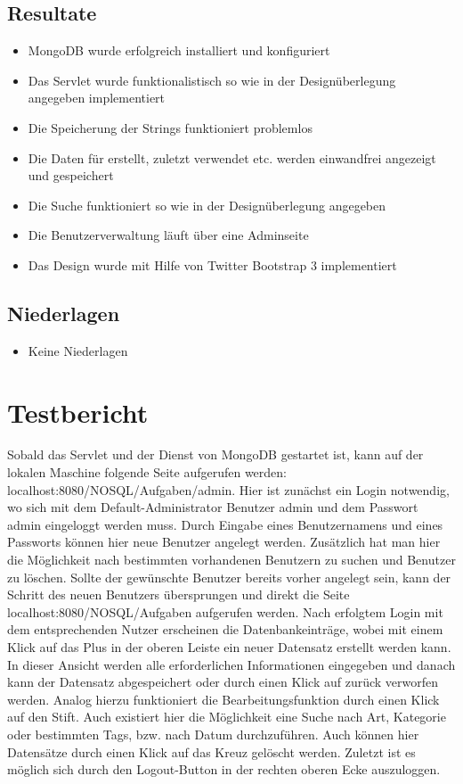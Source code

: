 \documentclass[a4paper,12pt]{scrreprt}
\begin{document}
\section{Resultate}
\begin{itemize}
\item MongoDB wurde erfolgreich installiert und konfiguriert
\item Das Servlet wurde funktionalistisch so wie in der Designüberlegung angegeben implementiert
\item Die Speicherung der Strings funktioniert problemlos
\item Die Daten für erstellt, zuletzt verwendet etc. werden einwandfrei angezeigt und gespeichert
\item Die Suche funktioniert so wie in der Designüberlegung angegeben
\item Die Benutzerverwaltung läuft über eine Adminseite
\item Das Design wurde mit Hilfe von Twitter Bootstrap 3 implementiert
\end{itemize}

\section{Niederlagen}
\begin{itemize}
\item Keine Niederlagen
\end{itemize}

\chapter{Testbericht}
Sobald das Servlet und der Dienst von MongoDB gestartet ist, kann auf der lokalen Maschine folgende Seite aufgerufen werden:
localhost:8080/NOSQL/Aufgaben/admin. Hier ist zunächst ein Login notwendig, wo sich mit dem Default-Administrator Benutzer admin und dem Passwort admin eingeloggt werden muss. Durch Eingabe eines Benutzernamens und eines Passworts können hier neue Benutzer angelegt werden. Zusätzlich hat man hier die Möglichkeit nach bestimmten vorhandenen Benutzern zu suchen und Benutzer zu löschen. Sollte der gewünschte Benutzer bereits vorher angelegt sein, kann der Schritt des neuen Benutzers übersprungen und direkt die Seite localhost:8080/NOSQL/Aufgaben aufgerufen werden. Nach erfolgtem Login mit dem entsprechenden Nutzer erscheinen die Datenbankeinträge, wobei mit einem Klick auf das Plus in der oberen Leiste ein neuer Datensatz erstellt werden kann. In dieser Ansicht werden alle erforderlichen Informationen eingegeben und danach kann der Datensatz abgespeichert oder durch einen Klick auf zurück verworfen werden. Analog hierzu funktioniert die Bearbeitungsfunktion durch einen Klick auf den Stift. Auch existiert hier die Möglichkeit eine Suche nach Art, Kategorie oder bestimmten Tags, bzw. nach Datum durchzuführen. Auch können hier Datensätze durch einen Klick auf das Kreuz gelöscht werden. Zuletzt ist es möglich sich durch den Logout-Button in der rechten oberen Ecke auszuloggen.
\end{document}
